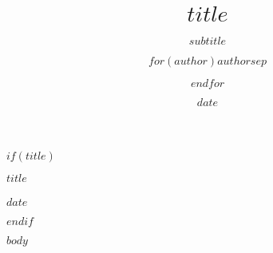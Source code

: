 \documentclass[letterpaper,11pt]{article}
\title{$title$}
\subtitle{$subtitle$}
\author{$for(author)$$author$$sep$ \and $endfor$}
\date{$date$}
\begin{document}
\thispagestyle{empty}				%

$if(title)$							%
\begin{flushleft}
{\LARGE\sffamily\bfseries {$title$}}
\vspace{3ex}\\
{\large{}}
\\{\sffamily $date$}
\vspace{2ex}
\end{flushleft}
$endif$

\newpage

$body$								%
\end{document}
